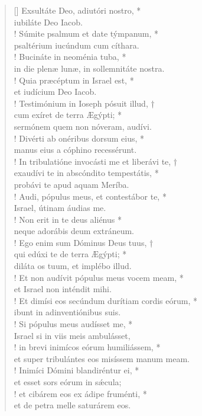 \begin{verse}[\versewidth]
Exsultáte Deo, adiutóri nostro, *\\
iubiláte Deo Iacob.\\!
\vin Súmite psalmum et date týmpanum, *\\
\vin psaltérium iucúndum cum cíthara.\\!
Bucináte in neoménia tuba, *\\
in die plenæ lunæ, in sollemnitáte nostra.\\!
\vin Quia præcéptum in Israel est, *\\
\vin et iudícium Deo Iacob.\\!
Testimónium in Ioseph pósuit illud, †\\
cum exíret de terra Ægýpti; *\\
sermónem quem non nóveram, audívi.\\!
\vin Divérti ab onéribus dorsum eius, *\\
\vin manus eius a cóphino recessérunt.\\!
In tribulatióne invocásti me et liberávi te, †\\
exaudívi te in abscóndito tempestátis, *\\
probávi te apud aquam Meríba.\\!
\vin Audi, pópulus meus, et contestábor te, *\\
\vin Israel, útinam áudias me.\\!
Non erit in te deus aliénus *\\
neque adorábis deum extráneum.\\!
\vin Ego enim sum Dóminus Deus tuus, †\\
\vin qui edúxi te de terra Ægýpti; *\\
\vin diláta os tuum, et implébo illud.\\!
Et non audívit pópulus meus vocem meam, *\\
et Israel non inténdit mihi.\\!
\vin Et dimísi eos secúndum durítiam cordis eórum, *\\
\vin ibunt in adinventiónibus suis.\\!
Si pópulus meus audísset me, *\\
Israel si in viis meis ambulásset,\\!
\vin in brevi inimícos eórum humiliássem, *\\
\vin et super tribulántes eos misíssem manum meam.\\!
Inimíci Dómini blandiréntur ei, *\\
et esset sors eórum in s\'{æ}cula;\\!
\vin et cibárem eos ex ádipe fruménti, *\\
\vin et de petra melle saturárem eos.\\
\end{verse}
\vspace{1cm}


